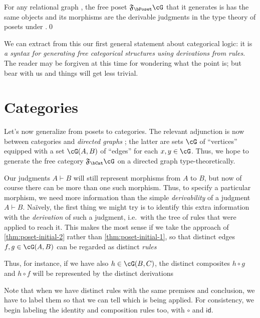 \documentclass{book}
\def\idfunc{\mathsf{id}}
\let\types\vdash
\newcommand{\F}[1]{\mathfrak{F}_{#1}}
\begin{document}
\begin{thm}\label{thm:poset-initial-2}
  For any relational graph \cG, the free poset $\F{\bPoset}\cG$ that it generates is has the same objects and its morphisms are the derivable judgments in the type theory of posets under \cG.\qed
\end{thm}

We can extract from this our first general statement about categorical logic: it is \emph{a syntax for generating free categorical structures using derivations from rules}.
The reader may be forgiven at this time for wondering what the point is; but bear with us and things will get less trivial.


\section{Categories}
\label{sec:categories}

Let's now generalize from posets to categories.
The relevant adjunction is now between categories \bCat and \emph{directed graphs} \bGr; the latter are sets $\cG$ of ``vertices'' equipped with a set $\cG(A,B)$ of ``edges'' for each $x,y\in \cG$.
Thus, we hope to generate the free category $\F{\bCat}\cG$ on a directed graph \cG type-theoretically.

Our judgments $A\types B$ will still represent morphisms from $A$ to $B$, but now of course there can be more than one such morphism.
Thus, to specify a particular morphism, we need more information than the simple \emph{derivability} of a judgment $A\types B$.
Na\"ively, the first thing we might try is to identify this extra information with the \emph{derivation} of such a judgment, i.e.\ with the tree of rules that were applied to reach it.
This makes the most sense if we take the approach of \cref{thm:poset-initial-2} rather than \cref{thm:poset-initial-1}, so that distinct edges $f,g\in \cG(A,B)$ can be regarded as distinct \emph{rules}
Thus, for instance, if we have also $h\in \cG(B,C)$, the distinct composites $h\circ g$ and $h\circ f$ will be represented by the distinct derivations
Note that when we have distinct rules with the same premises and conclusion, we have to label them so that we can tell which is being applied.
For consistency, we begin labeling the identity and composition rules too, with $\circ$ and $\idfunc$.
\end{document}
